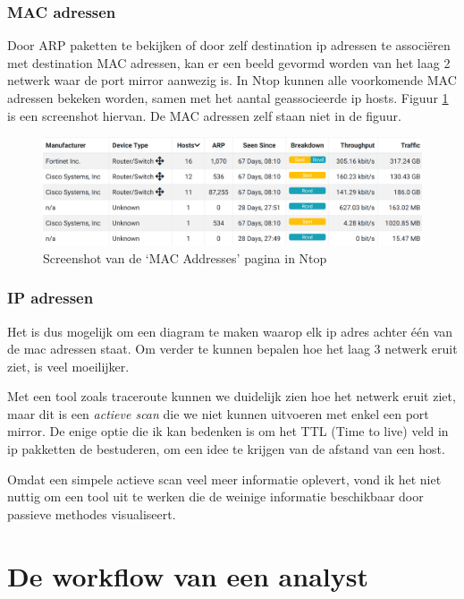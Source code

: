 \documentclass[a4paper,12pt]{report}
\begin{document}
\subsection{MAC adressen}
Door ARP paketten te bekijken of door zelf destination ip adressen te associëren met destination MAC adressen, kan er een beeld gevormd worden van het laag 2 netwerk waar de port mirror aanwezig is.
In Ntop kunnen alle voorkomende MAC adressen bekeken worden, samen met het aantal geassocieerde ip hosts.
Figuur \ref{fig:visualisatie-netwerk-layout-ntop-mac} is een screenshot hiervan.
De MAC adressen zelf staan niet in de figuur.

\begin{figure}[H]
  \centering
  \includegraphics[width=\textwidth]{visualisatie-netwerk-layout-ntop-mac}
  \caption{Screenshot van de `MAC Addresses' pagina in Ntop}
  \label{fig:visualisatie-netwerk-layout-ntop-mac}
\end{figure}

\subsection{IP adressen}
Het is dus mogelijk om een diagram te maken waarop elk ip adres achter één van de mac adressen staat.
Om verder te kunnen bepalen hoe het laag 3 netwerk eruit ziet, is veel moeilijker.

Met een tool zoals traceroute kunnen we duidelijk zien hoe het netwerk eruit ziet, maar dit is een \emph{actieve scan} die we niet kunnen uitvoeren met enkel een port mirror.
De enige optie die ik kan bedenken is om het TTL (Time to live) veld in ip pakketten de bestuderen, om een idee te krijgen van de afstand van een host.

Omdat een simpele actieve scan veel meer informatie oplevert, vond ik het niet nuttig om een tool uit te werken die de weinige informatie beschikbaar door passieve methodes visualiseert.

\chapter{De workflow van een analyst}
\end{document}
